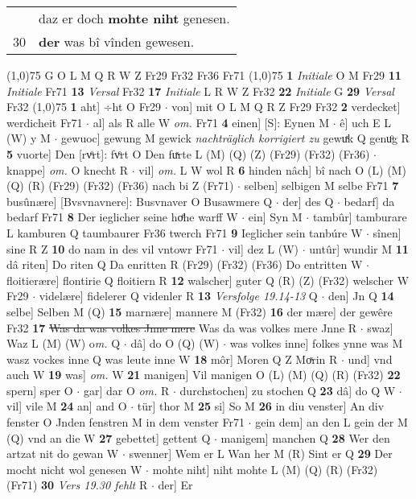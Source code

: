 \documentclass[8pt,a4paper,notitlepage]{article}
\begin{document}
\begin{table}[ht]
\begin{minipage}[t]{0.5\linewidth}
\begin{tabular}{rl}
 & daz er doch \textbf{mohte niht} genesen.\\ 
30 & \textbf{der} was bî vînden gewesen.\\ 
\end{tabular}
\scriptsize
\line(1,0){75} \newline
G O L M Q R W Z Fr29 Fr32 Fr36 Fr71 \newline
\line(1,0){75} \newline
\textbf{1} \textit{Initiale} O M Fr29  \textbf{11} \textit{Initiale} Fr71  \textbf{13} \textit{Versal} Fr32  \textbf{17} \textit{Initiale} L R W Z Fr32  \textbf{22} \textit{Initiale} G  \textbf{29} \textit{Versal} Fr32  \newline
\line(1,0){75} \newline
\textbf{1} aht] ÷ht O Fr29  $\cdot$ von] mit O L M Q R Z Fr29 Fr32 \textbf{2} verdecket] werdicheit Fr71  $\cdot$ al] als R alle W \textit{om.} Fr71 \textbf{4} einen] [S]: Eynen M  $\cdot$ ê] uch E L (W) y M  $\cdot$ gewuoc] gewung M gewick \textit{nachträglich korrigiert zu} gewuͯk Q genuͦg R \textbf{5} vuorte] Den [rvͦrt]: fvͦrt O Den fuͯrte L (M) (Q) (Z) (Fr29) (Fr32) (Fr36)  $\cdot$ knappe] \textit{om.} O knecht R  $\cdot$ vil] \textit{om.} L W wol R \textbf{6} hinden nâch] bî nach O (L) (M) (Q) (R) (Fr29) (Fr32) (Fr36) nach bi Z (Fr71)  $\cdot$ selben] selbigen M selbe Fr71 \textbf{7} busûnære] [Bvsvnavnere]: Busvnaver O Busawmere Q  $\cdot$ der] des Q  $\cdot$ bedarf] da bedarf Fr71 \textbf{8} Der ieglicher seine hoͤhe warff W  $\cdot$ ein] Syn M  $\cdot$ tambûr] tamburare L kamburen Q taumbaurer Fr36 twerch Fr71 \textbf{9} Ieglicher sein tanbúre W  $\cdot$ sînen] sine R Z \textbf{10} do nam in des vil vntowr Fr71  $\cdot$ vil] dez L (W)  $\cdot$ untûr] wundir M \textbf{11} dâ riten] Do riten Q Da enritten R (Fr29) (Fr32) (Fr36) Do entritten W  $\cdot$ floitierære] flontirie Q floitiern R \textbf{12} walscher] guter Q (R) (Z) (Fr32) welscher W Fr29  $\cdot$ videlære] fidelerer Q videnler R \textbf{13} \textit{Versfolge 19.14-13} Q   $\cdot$ den] Jn Q \textbf{14} selbe] Selben M (Q) \textbf{15} marnære] mannere M (Fr32) \textbf{16} der mære] der gewêre Fr32 \textbf{17} \sout{Was da was volkes Jnne mere} Was da was volkes mere Jnne R  $\cdot$ swaz] Waz L (M) (W) o\textit{m. } Q  $\cdot$ dâ] do O (Q) (W)  $\cdot$ was volkes inne] folkes ynne was M wasz vockes inne Q was leute inne W \textbf{18} môr] Moren Q Z Moͯrin R  $\cdot$ und] vnd auch W \textbf{19} was] \textit{om.} W \textbf{21} manigen] Vil manigen O (L) (M) (Q) (R) (Fr32) \textbf{22} spern] sper O  $\cdot$ gar] dar O \textit{om.} R  $\cdot$ durchstochen] zu stochen Q \textbf{23} dâ] do Q W  $\cdot$ vil] vile M \textbf{24} an] and O  $\cdot$ tür] thor M \textbf{25} si] So M \textbf{26} in diu venster] An div fenster O Jnden fenstren M in dem venster Fr71  $\cdot$ gein dem] an den L gein der M (Q) vnd an die W \textbf{27} gebettet] gettent Q  $\cdot$ manigem] manchen Q \textbf{28} Wer den artzat nit do gewan W  $\cdot$ swenner] Wem er L Wan her M (R) Sint er Q \textbf{29} Der mocht nicht wol genesen W  $\cdot$ mohte niht] niht mohte L (M) (Q) (R) (Fr32) (Fr71) \textbf{30} \textit{Vers 19.30 fehlt} R   $\cdot$ der] Er 
\end{minipage}
\end{table}
\end{document}
